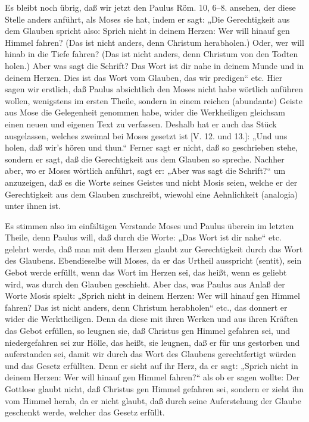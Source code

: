 Es bleibt noch übrig, daß wir jetzt den Paulus Röm. 10, 6–8. ansehen, der diese Stelle anders anführt, als Moses sie hat, indem er sagt: „Die Gerechtigkeit aus dem Glauben spricht also: Sprich nicht in deinem Herzen: Wer will hinauf gen Himmel fahren? (Das ist nicht anders, denn Christum herabholen.) Oder, wer will hinab in die Tiefe fahren? (Das ist nicht anders, denn Christum von den Todten holen.) Aber was sagt die Schrift? Das Wort ist dir nahe in deinem Munde und in deinem Herzen. Dies ist das Wort vom Glauben, das wir predigen“ etc. Hier sagen wir erstlich, daß Paulus absichtlich den Moses nicht habe wörtlich anführen wollen, wenigstens im ersten Theile, sondern in einem reichen (abundante) Geiste aus Mose die Gelegenheit genommen habe, wider die Werkheiligen gleichsam einen neuen und eigenen Text zu verfassen. Deshalb hat er auch das Stück ausgelassen, welches zweimal bei Moses gesetzt ist [V. 12. und 13.]: „Und uns holen, daß wir’s hören und thun.“ Ferner sagt er nicht, daß so geschrieben stehe, sondern er sagt, daß die Gerechtigkeit aus dem Glauben so spreche. Nachher aber, wo er Moses wörtlich anführt, sagt er: „Aber was sagt die Schrift?“
um anzuzeigen, daß es die Worte seines Geistes und nicht Mosis seien, welche er der Gerechtigkeit aus dem Glauben zuschreibt, wiewohl eine Aehnlichkeit (analogia) unter ihnen ist.

Es stimmen also im einfältigen Verstande Moses und Paulus überein im letzten Theile, denn Paulus will, daß durch die Worte: „Das Wort ist dir nahe“ etc. gelehrt werde, daß man mit dem Herzen glaubt zur Gerechtigkeit durch das Wort des Glaubens. Ebendieselbe will Moses, da er das Urtheil ausspricht (sentit), sein Gebot werde erfüllt, wenn das Wort im Herzen sei, das heißt, wenn es geliebt wird, was durch den Glauben geschieht. Aber das, was Paulus aus Anlaß der Worte Mosis spielt: „Sprich nicht in deinem Herzen: Wer will hinauf gen Himmel fahren? Das ist nicht anders, denn Christum herabholen“ etc., das donnert er wider die Werktheiligen. Denn da diese mit ihren Werken und aus ihren Kräften das Gebot erfüllen, so leugnen sie, daß Christus gen Himmel gefahren sei, und niedergefahren sei zur Hölle, das heißt, sie leugnen, daß er für uns gestorben und auferstanden sei, damit wir durch das Wort des Glaubens gerechtfertigt würden und das Gesetz erfüllten. Denn er sieht auf ihr Herz, da er sagt: „Sprich nicht in deinem Herzen: Wer will hinauf gen Himmel fahren?“ als ob er sagen wollte: Der Gottlose glaubt nicht, daß Christus gen Himmel gefahren sei, sondern er zieht ihn vom Himmel herab, da er nicht glaubt, daß durch seine Auferstehung der Glaube geschenkt werde, welcher das Gesetz erfüllt.

